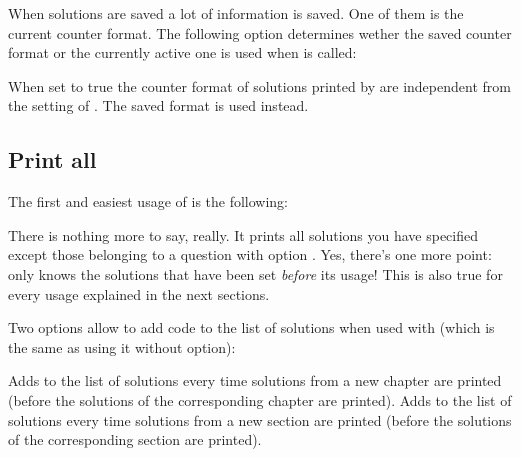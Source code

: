\documentclass[load-preamble+,scrartcl={DIV10}]{cnltx-doc}
\begin{document}
When solutions are saved a lot of information is saved. One of them is the
current counter format. The following option determines wether the saved
counter format or the currently active one is used when  is
called:
\begin{options}
    When set to true the counter format of solutions
    printed by \label{option:use-saved-counter-format} are
    independent from the setting of . The saved format
    is used instead.
\end{options}

\subsection{Print all}\label{sec:solutions-print-all}
The first and easiest usage of  is the following:
\begin{sourcecode}
  \printsolutions
\end{sourcecode}
There is nothing more to say, really. It prints all solutions you have
specified except those belonging to a question with option .
Yes, there's one more point:  only knows the solutions
that have been set \emph{before} its usage!  This is also true for every usage
explained in the next sections.

\begin{example}
  \printsolutions
\end{example}

Two options allow to add code to the list of solutions when used with
 (which is the same as using it without option):

\begin{options}
    Adds  to the list of solutions every time
    solutions from a new chapter are printed (before the solutions of the
    corresponding chapter are printed).
    Adds  to the list of solutions every time
    solutions from a new section are printed (before the solutions of the
    corresponding section are printed).
\end{options}
\end{document}
